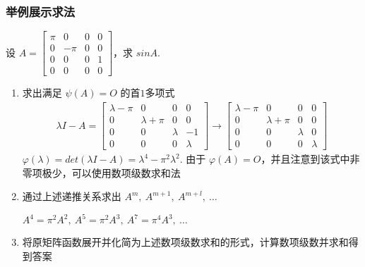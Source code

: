         \subsubsection{举例展示求法}
            \begin{problem}
                \par 设 $A = \begin{bmatrix}
                    \pi & 0 & 0 & 0 \\ 0 & -\pi & 0 & 0 \\ 0 & 0 & 0 & 1 \\ 0 & 0 & 0 & 0
                \end{bmatrix}$，求 $sinA$.
            \end{problem}
            \begin{solution}
                \begin{enumerate}
                    \item 求出满足 $\psi(A) = O$ 的首$1$多项式
                        \begin{align*}
                            \lambda I - A = \begin{bmatrix}
                                \lambda - \pi & 0 & 0 & 0 \\ 0 & \lambda + \pi & 0 & 0 \\ 0 & 0 & \lambda & -1 \\ 0 & 0 & 0 & \lambda
                            \end{bmatrix} \rightarrow \begin{bmatrix}
                                \lambda - \pi & 0 & 0 & 0 \\ 0 & \lambda + \pi & 0 & 0 \\ 0 & 0 & \lambda & 0 \\ 0 & 0 & 0 & \lambda
                            \end{bmatrix}
                        \end{align*}
                        $\varphi(\lambda) = det(\lambda I - A) = \lambda^4 - \pi^2\lambda^2$. 由于 $\varphi(A) = O$，并且注意到该式中非零项极少，可以使用数项级数求和法
                    \item 通过上述递推关系求出 $A^{m}, \ A^{m+1}, \ A^{m+l}, \ \dots$
                        \par $A^4 = \pi^2A^2, \ A^5 = \pi^2A^3, \ A^7 = \pi^4A^3, \ \dots$
                    \item 将原矩阵函数展开并化简为上述数项级数求和的形式，计算数项级数并求和得到答案
                        \begin{align*}

\end{align*}
\end{enumerate}
\end{solution}
